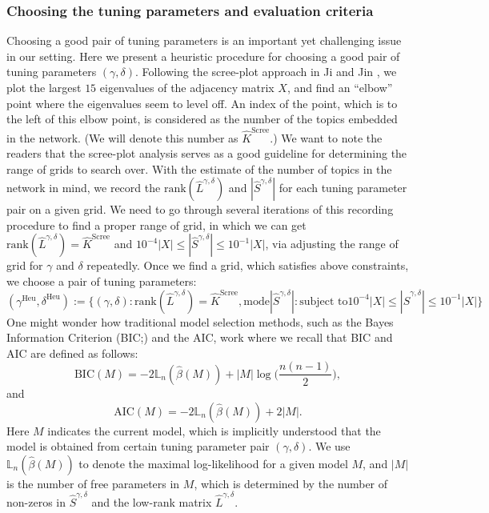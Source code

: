 \documentclass[AMS,STIX1COL]{WileyNJD-v2}
\begin{document}
{\subsubsection{Choosing the tuning parameters and evaluation criteria} \label{sec:Eval-crit}
Choosing a good pair of tuning parameters is an important yet challenging issue in our setting.
Here we present a heuristic procedure for choosing a good pair of tuning parameters $(\gamma,\delta)$.
Following the scree-plot approach in Ji and Jin \cite{ji2016coauthorship}, we plot the largest $15$ eigenvalues of the adjacency matrix $X$, and find an ``elbow'' point where the eigenvalues seem to level off.
An index of the point, which is to the left of this elbow point, is considered as the number of the topics embedded in the network.
(We will denote this number as $\widehat{K}^{\text{Scree}}$.)
We want to note the readers that the scree-plot analysis serves as a good guideline for determining the range of grids to search over.
With the estimate of the number of topics in the network in mind, we record the $\text{rank}(\widehat{L}^{\gamma,\delta})$ and $|\widehat{S}^{\gamma,\delta}|$ for each tuning parameter pair on a given grid.
We need to go through several iterations of this recording procedure to find a proper range of grid, in which we can get $\text{rank}(\widehat{L}^{\gamma,\delta})=\widehat{K}^{\text{Scree}}$
and $10^{-4}|X| \leq |\widehat{S}^{\gamma,\delta}| \leq 10^{-1}|X|$, via adjusting the range of grid for $\gamma$ and $\delta$ repeatedly.
Once we find a grid, which satisfies above constraints, we choose a pair of tuning parameters: %
\[
    (\gamma^{\text{Heu}},\delta^{\text{Heu}}):=
    \big\{(\gamma,\delta): \text{rank}(\widehat{L}^{\gamma,\delta})=\widehat{K}^{\text{Scree}},
    \mbox{mode} |\widehat{S}^{\gamma,\delta}|: \mbox{subject to} 10^{-4}|X| \leq |\widehat{S}^{\gamma,\delta}| \leq 10^{-1}|X| \big\}
\]
One might wonder how traditional model selection methods, such as the Bayes Information Criterion (BIC;\cite{schwarz1978estimating}) and the AIC, work where we recall that BIC and AIC are defined as follows:
\[
\mbox{BIC}(M) = -2  \mathbb{L}_n( \hat{\beta}(M)) + |M| \log \bigg(\frac{n(n-1)}{2}\bigg),
\]
and
\[
\mbox{AIC}(M) = -2  \mathbb{L}_n( \hat{\beta}(M)) + 2|M|.
\]
Here $M$ indicates the current model, which is implicitly understood that the model is obtained from certain tuning parameter pair $(\gamma,\delta)$.
We use $\mathbb{L}_n( \hat{\beta}(M))$ to denote the maximal log-likelihood for a given model $M$,
and $|M|$ is the number of free parameters in $M$, which is determined by the number of non-zeros in $\widehat{S}^{\gamma,\delta}$ and the low-rank matrix $\widehat{L}^{\gamma,\delta}$.
}
\end{document}
